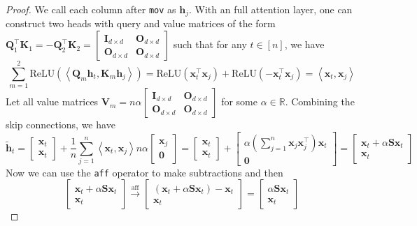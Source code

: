 \documentclass[11pt]{article}
\theoremstyle{plain}
\theoremstyle{definition}
\theoremstyle{remark}
\newcommand{\zero}{\boldsymbol{0}}
\renewcommand{\^}[1]{^{(#1)}}
\newcommand{\bx}{\boldsymbol{x}}
\newcommand{\bh}{\boldsymbol{h}}
\newcommand{\bK}{\boldsymbol{K}}
\newcommand{\bO}{\boldsymbol{O}}
\newcommand{\bQ}{\boldsymbol{Q}}
\newcommand{\bI}{\boldsymbol{I}}
\newcommand{\bS}{\boldsymbol{S}}
\newcommand{\bV}{\boldsymbol{V}}
\newcommand{\inner}[1]{ \left\langle {#1} \right\rangle }
\begin{document}
\begin{proof}
We call each column after \verb|mov| as $\bh_j$. With an full attention layer, one can construct two heads with query and value matrices of the form $\bQ_1^\top \bK_1 = -\bQ_2^\top \bK_2 = \begin{bmatrix}
    \bI_{d \times d} & \bO_{d \times d} \\
    \bO_{d \times d} & \bO_{d \times d}
\end{bmatrix}$ such that for any $t \in [n]$, we have 
\begin{equation}
    \sum_{m=1}^2 \mathrm{ReLU} \left(\inner{\bQ_m \bh_t, \bK_m \bh_j}\right) = \mathrm{ReLU}(\bx_t^\top \bx_j) +  \mathrm{ReLU}(-\bx_t^\top \bx_j) = \inner{\bx_t, \bx_j}
\end{equation}
Let all value matrices $\bV_m =n \alpha \begin{bmatrix}
    \bI_{d \times d} & \bO_{d \times d} \\
    \bO_{d \times d} & \bO_{d \times d}
\end{bmatrix}$ for some $\alpha \in \mathbb R$. Combining the skip connections, we have 
\begin{equation}
    \tilde{\bh}_t = \begin{bmatrix}
        \bx_t \\ \bx_t
    \end{bmatrix} + \frac{1}{n} \sum_{j=1}^n \inner {\bx_t, \bx_j} n \alpha \begin{bmatrix}
        \bx_j \\ \zero 
    \end{bmatrix}  = \begin{bmatrix}
        \bx_t \\ \bx_t
    \end{bmatrix} + \begin{bmatrix}
       \alpha \left(\sum_{j=1}^n \bx_j \bx_j^\top \right) \bx_t \\ \zero
    \end{bmatrix} = \begin{bmatrix}
        \bx_t + \alpha \bS \bx_t \\ \bx_t
    \end{bmatrix} 
\end{equation}
Now we can use the \verb|aff| operator to make subtractions and then
\begin{equation}
    \begin{bmatrix}
        \bx_t + \alpha \bS \bx_t \\ \bx_t
    \end{bmatrix}  \overset{\mathrm{aff}}{\longrightarrow}\begin{bmatrix}
        (\bx_t + \alpha \bS \bx_t) - \bx_t  \\ \bx_t
    \end{bmatrix}  = \begin{bmatrix}
         \alpha \bS \bx_t \\ \bx_t
    \end{bmatrix}
\end{equation}


\end{proof}
\end{document}
